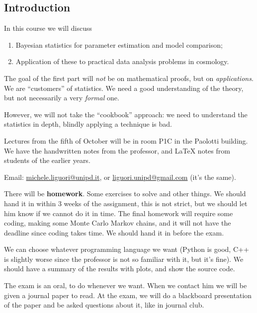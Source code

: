 \documentclass[main.tex]{subfiles}
\begin{document}
\subsection*{Introduction}


In this course we will discuss
\begin{enumerate}
    \item Bayesian statistics for parameter estimation and model comparison;
    \item Application of these to practical data analysis problems in cosmology.
\end{enumerate}

The goal of the first part will \emph{not} be on mathematical proofs, but on \emph{applications}. We are ``customers'' of statistics.
We need a good understanding of the theory, but not necessarily a very \emph{formal} one. 

However, we will not take the ``cookbook'' approach: we need to understand the statistics in depth, blindly applying a technique is bad. 

Lectures from the fifth of October will be in room P1C in the Paolotti building. 
We have the handwritten notes from the professor, and LaTeX notes from students of the earlier years. 

Email: \url{michele.liguori@unipd.it}, or \url{liguori.unipd@gmail.com} (it's the same).

There will be \textbf{homework}. Some exercises to solve and other things. We should hand it in within 3 weeks of the assignment, this is not strict, but we should let him know if we cannot do it in time. 
The final homework will require some coding, making some Monte Carlo Markov chains, and it will not have the deadline since coding takes time. We should hand it in before the exam. 

We can choose whatever programming language we want (Python is good, C++ is slightly worse since the professor is not so familiar with it, but it's fine). We should have a summary of the results with plots, and show the source code. 

The exam is an oral, to do whenever we want. 
When we contact him we will be given a journal paper to read. At the exam, we will do a blackboard presentation of the paper and be asked questions about it, like in journal club.
\end{document}
